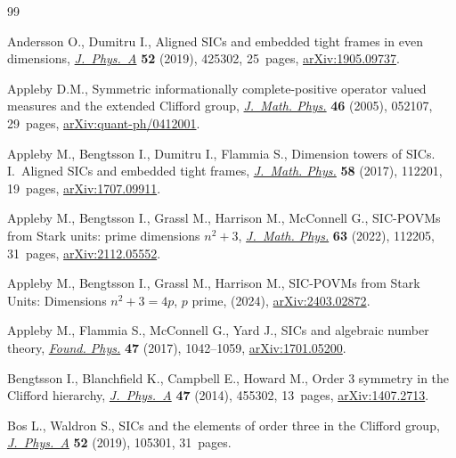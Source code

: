\documentclass[pdftex]{sigma}
\numberwithin{equation}{section}
\begin{document}
\begin{thebibliography}{99}
\footnotesize\itemsep=0pt

Andersson O., Dumitru I., Aligned {SIC}s and embedded tight frames in even
 dimensions, \href{https://doi.org/10.1088/1751-8121/ab434e}{\textit{J.~Phys.~A}} \textbf{52} (2019), 425302, 25~pages,
 \href{https://arxiv.org/abs/1905.09737}{arXiv:1905.09737}.

Appleby D.M., Symmetric informationally complete-positive operator valued
 measures and the extended {C}lifford group, \href{https://doi.org/10.1063/1.1896384}{\textit{J.~Math. Phys.}}
 \textbf{46} (2005), 052107, 29~pages, \href{https://arxiv.org/abs/quant-ph/0412001}{arXiv:quant-ph/0412001}.

Appleby M., Bengtsson I., Dumitru I., Flammia S., Dimension towers of {SIC}s.
 {I}.~{A}ligned {SIC}s and embedded tight frames, \href{https://doi.org/10.1063/1.4999844}{\textit{J.~Math. Phys.}}
 \textbf{58} (2017), 112201, 19~pages, \href{https://arxiv.org/abs/1707.09911}{arXiv:1707.09911}.

Appleby M., Bengtsson I., Grassl M., Harrison M., McConnell G., S{IC}-{POVM}s
 from {S}tark units: prime dimensions {$n^2 + 3$}, \href{https://doi.org/10.1063/5.0083520}{\textit{J.~Math. Phys.}}
 \textbf{63} (2022), 112205, 31~pages, \href{https://arxiv.org/abs/2112.05552}{arXiv:2112.05552}.

Appleby M., Bengtsson I., Grassl M., Harrison M., SIC-POVMs from Stark Units: Dimensions
 {$n^2+3=4p$}, {$p$} prime, (2024), \href{https://arxiv.org/abs/2403.02872}{arXiv:2403.02872}.

Appleby M., Flammia S., McConnell G., Yard J., S{IC}s and algebraic number
 theory, \href{https://doi.org/10.1007/s10701-017-0090-7}{\textit{Found. Phys.}} \textbf{47} (2017), 1042--1059,
 \href{https://arxiv.org/abs/1701.05200}{arXiv:1701.05200}.

Bengtsson I., Blanchfield K., Campbell E., Howard M., Order 3 symmetry in the
 {C}lifford hierarchy, \href{https://doi.org/10.1088/1751-8113/47/45/455302}{\textit{J.~Phys.~A}} \textbf{47} (2014), 455302,
 13~pages, \href{https://arxiv.org/abs/1407.2713}{arXiv:1407.2713}.

Bos L., Waldron S., S{IC}s and the elements of order three in the {C}lifford
 group, \href{https://doi.org/10.1088/1751-8121/aafff3}{\textit{J.~Phys.~A}} \textbf{52} (2019), 105301, 31~pages.


\end{thebibliography}
\end{document}
